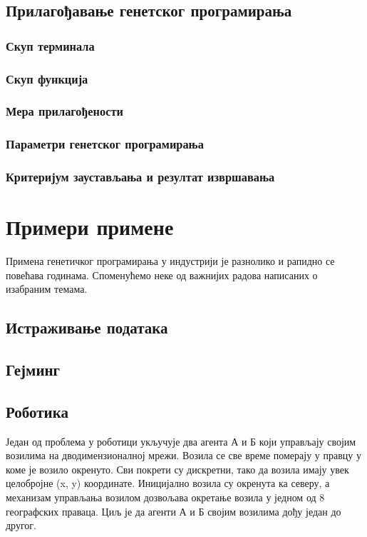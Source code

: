 \documentclass[a4paper]{article}
\begin{document}
\subsection{Прилагођавање генетског програмирања}
\subsubsection{Скуп терминала}
\subsubsection{Скуп функција}
\subsubsection{Мера прилагођености}
\subsubsection{Параметри генетског програмирања}
\subsubsection{Критеријум заустављања и резултат извршавања}


\section{Примери примене}
Примена генетичког програмирања у индустрији је разнолико и рапидно се повећава годинама. Споменућемо неке од важнијих радова написаних о изабраним темама.
\subsection{Истраживање података}
\subsection{Гејминг}
\subsection{Роботика}
Један од проблема у роботици укључује два агента А и Б који управљају својим возилима на дводимензионалној мрежи. Возила се све време померају у правцу у коме је возило окренуто. Сви покрети су дискретни, тако да возила имају увек целобројне (x, y) координате. Иницијално возила су окренута ка северу, а механизам управљања возилом дозвољава окретање возила у једном од 8 географских праваца. Циљ је да агенти А и Б својим возилима дођу један до другог.
\end{document}
